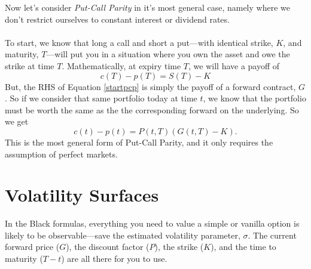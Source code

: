 \documentclass[12pt]{article}
\theoremstyle{plain}
\theoremstyle{definition}
\theoremstyle{remark}
\begin{document}
Now let's consider \emph{Put-Call Parity} in it's most general case,
namely where we don't restrict ourselves to constant interest or
dividend rates.
\\
\\
To start, we know that long a call and short a put---with identical
strike, $K$, and maturity, $T$---will put you
in a situation where you own the asset and owe the strike at time
$T$. Mathematically, at expiry time $T$, we will have a payoff of
\begin{equation}
   \label{startpcp}
   c(T)-p(T) = S(T) - K
\end{equation}
But, the RHS of Equation \ref{startpcp} is simply the payoff of a
forward contract, $G$.  So if we consider that same portfolio today 
at time $t$,
we know that the portfolio must be worth the same as the
the corresponding forward on the underlying. So we get
\begin{equation}
   \label{pcp}
   c(t) - p(t) = P(t,T) \left(G(t,T) - K\right).
\end{equation}
This is the most general form of Put-Call Parity, and it only 
requires the assumption of perfect markets.


\newpage

\section{Volatility Surfaces}

In the Black formulas, everything you need to value a simple or vanilla
option is likely to be observable---save the estimated volatility
parameter, $\sigma$.  The current forward price ($G$), the discount
factor ($P$), the strike ($K$), and the time to maturity ($T-t$) are
all there for you to use.  
\end{document}
